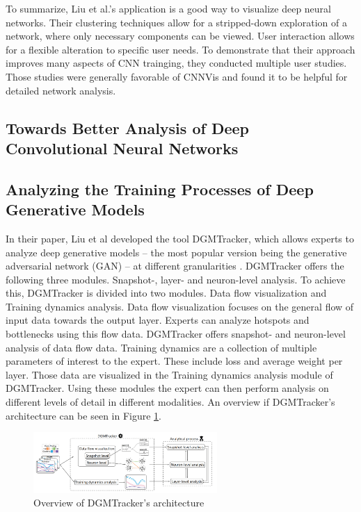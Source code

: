 \documentclass{acmsiggraph}               %
\begin{document}
To summarize, Liu et al.'s application is a good way to visualize deep neural networks. Their clustering techniques allow for a stripped-down exploration of a network, where only necessary components can be viewed. User interaction allows for a flexible alteration to specific user needs. To demonstrate that their approach improves many aspects of CNN trainging, they conducted multiple user studies. Those studies were generally favorable of CNNVis and found it to be helpful for detailed network analysis.

\subsection{Towards Better Analysis of Deep Convolutional Neural Networks}

\subsection{Analyzing the Training Processes of Deep Generative Models}
In their paper, Liu et al developed the tool DGMTracker, which allows experts to analyze deep generative models -- the most popular version being the generative adversarial network (GAN) -- at different granularities \cite{Liu2018}. 
DGMTracker offers the following three modules. Snapshot-, layer- and neuron-level analysis.
To achieve this, DGMTracker is divided into two modules. Data flow visualization and Training dynamics analysis.
Data flow visualization focuses on the general flow of input data towards the output layer. Experts can analyze hotspots and bottlenecks using this flow data. DGMTracker offers snapshot- and neuron-level analysis of data flow data.
Training dynamics are a collection of multiple parameters of interest to the expert. These include loss and average weight per layer. Those data are visualized in the Training dynamics analysis module of DGMTracker.
Using these modules the expert can then perform analysis on different levels of detail in different modalities.
An overview if DGMTracker's architecture can be seen in Figure \ref{fig:mengchen1}.

\begin{figure}[!htb]
  \centering
  \includegraphics[width=2.75in]{mengchen1}
  \caption{Overview of DGMTracker's architecture \protect\cite{Liu2018}}
  \label{fig:mengchen1}
\end{figure}
\end{document}
